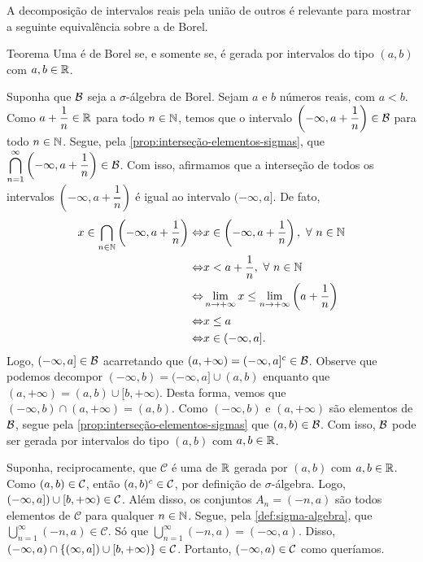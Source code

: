 A decomposição de intervalos reais pela união de outros é relevante para mostrar a seguinte equivalência sobre a \sigal de Borel.\\
\begin{env}{Teorema}
\label{teo:equiv-borel}
    Uma \sigal é de Borel  se, e somente se, é gerada por intervalos do tipo $(a,b)$ com $a,b \in \mathbb{R}$.
    \vspace{-0.2cm}
\end{env}
\begin{prova}
   Suponha que $\operatorname{\mathcal{B}}$ seja a $\sigma$-álgebra de Borel. 
   Sejam $a$ e $b$ números reais, com $a<b$.
   Como $a + \dfrac{1}{n} \in \mathbb{R}$ para todo $n \in \operatorname{\mathbb{N}}$, temos que o intervalo
   $
   \left(-\infty, a + \dfrac{1}{n}\right) \in \operatorname{\mathcal{B}}$ para todo $n \in \operatorname{\mathbb{N}}
   $.
   Segue, pela \ref{prop:interseção-elementos-sigmas}, que
   $
   \displaystyle \bigcap_{n = 1}^\infty \left(-\infty, a+ \dfrac{1}{n}\right) \in \operatorname{\mathcal{B}}
   $.
   Com isso, afirmamos que a interseção de todos os intervalos $\left(-\infty, a + \dfrac{1}{n}\right)$ é igual ao intervalo $(-\infty, a]$.
   De fato,
   \begin{align*}
	x \in \bigcap_{n \in \operatorname{\mathbb{N}}} \left(-\infty, a + \dfrac{1}{n}\right)
   	\Leftrightarrow & x \in \left(-\infty, a + \dfrac{1}{n}\right), \ \forall \ n \in \operatorname{\mathbb{N}}\\
   	\Leftrightarrow & x < a + \dfrac{1}{n}, \ \forall \ n \in \operatorname{\mathbb{N}}\\
   	\Leftrightarrow & \displaystyle \lim_{n \to +\infty} x \leq \displaystyle \lim_{n \to +\infty} \left(a + \dfrac{1}{n}\right)\\
   	\Leftrightarrow & x \leq a\\
   	\Leftrightarrow & x \in (-\infty, a].
   \end{align*}
	Logo, $(-\infty, a] \in \operatorname{\mathcal{B}}$ acarretando que $(a, +\infty) = (-\infty, a]^c \in \operatorname{\mathcal{B}}$.
	Observe que podemos decompor $(-\infty, b) = (-\infty,a] \cup (a, b)$ enquanto que $(a, +\infty) = (a, b) \cup [b, +\infty)$.
	Desta forma, vemos que $(-\infty, b) \cap (a, +\infty) = (a,b)$. 
	Como $(-\infty, b)$ e $(a, +\infty)$ são elementos de $\operatorname{\mathcal{B}}$, segue pela 
	\ref{prop:interseção-elementos-sigmas} que $(a,b) \in \operatorname{\mathcal{B}}$.
	Com isso, $\operatorname{\mathcal{B}}$ pode ser gerada por intervalos do tipo $(a,b)$ com $a,b \in \mathbb{R}$.
   
	Suponha, reciprocamente, que $\mathcal{C}$ é uma \sigal de $\mathbb{R}$ gerada por $(a,b)$ com $a,b \in \mathbb{R}$.
	Como $(a, b) \in \operatorname{\mathcal{C}}$, então $(a,b)^c \in \operatorname{\mathcal{C}}$, por definição de $\sigma$-álgebra.
	Logo, $(-\infty,a])\cup [b,+\infty) \in \operatorname{\mathcal{C}}$.
	Além disso, os conjuntos $A_n = (-n, a)$ são todos elementos de $\mathcal{C}$ para qualquer $n \in \operatorname{\mathbb{N}}$.
	Segue, pela  \ref{def:sigma-algebra}, que 
	$\displaystyle \bigcup_{n = 1}^\infty (-n,a) \in \mathcal{C}$.
	Só que $\displaystyle \bigcup_{n = 1}^\infty (-n,a) = (-\infty, a)$. 
	Disso, $(-\infty, a)\cap \left\{(\infty,a])\cup [b,+\infty)\right\} \in \operatorname{\mathcal{C}}$. Portanto,  $(-\infty, a) \in \operatorname{\mathcal{C}}$ como queríamos.
\end{prova}

